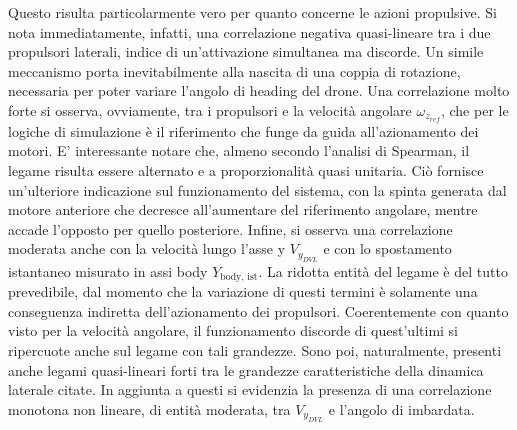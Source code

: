 Questo risulta particolarmente vero per quanto concerne le azioni propulsive. Si nota immediatamente, infatti, una correlazione negativa quasi-lineare tra i due propulsori laterali, indice di un'attivazione simultanea ma discorde. Un simile meccanismo porta inevitabilmente alla nascita di una coppia di rotazione, necessaria per poter variare l'angolo di heading del drone. Una correlazione molto forte si osserva, ovviamente, tra i propulsori e la velocità angolare $\omega_{z_{ref}}$, che per le logiche di simulazione è il riferimento che funge da guida all'azionamento dei motori. E' interessante notare che, almeno secondo l'analisi di Spearman, il legame risulta essere alternato e a proporzionalità quasi unitaria. Ciò fornisce un'ulteriore indicazione sul funzionamento del sistema, con la spinta generata dal motore anteriore che decresce all'aumentare del riferimento angolare, mentre accade l'opposto per quello posteriore. Infine, si osserva una correlazione moderata anche con la velocità lungo l'asse y $V_{y_{DVL}}$ e con lo spostamento istantaneo misurato in assi body $Y_{\text{body, ist}}$. La ridotta entità del legame è del tutto prevedibile, dal momento che la variazione di questi termini è solamente una conseguenza indiretta dell'azionamento dei propulsori. Coerentemente con quanto visto per la velocità angolare, il funzionamento discorde di quest'ultimi si ripercuote anche sul legame con tali grandezze. Sono poi, naturalmente, presenti anche legami quasi-lineari forti tra le grandezze caratteristiche della dinamica laterale citate. In aggiunta a questi si evidenzia la presenza di una correlazione monotona non lineare, di entità moderata, tra $V_{y_{DVL}}$ e l'angolo di imbardata.


